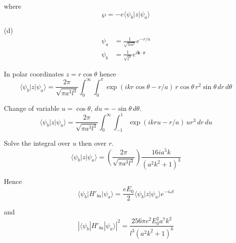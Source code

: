 where
\begin{equation*}
\wp=-e\langle\psi_b|z|\psi_a\rangle
\end{equation*}

(d)
\begin{align*}
\psi_a&=\frac{1}{\sqrt{\pi a^3}}e^{-r/a}
\\
\psi_b&=\frac{1}{\sqrt{l^3}}e^{i\mathbf k\cdot\mathbf r}
\end{align*}

In polar coordinates $z=r\cos\theta$ hence
\begin{equation*}
\langle\psi_b|z|\psi_a\rangle
=\frac{2\pi}{\sqrt{\pi a^3l^3}}
\int_0^\infty\int_0^\pi
\exp(ikr\cos\theta-r/a)\,r\cos\theta\,r^2\sin\theta\,dr\,d\theta
\end{equation*}

Change of variable $u=\cos\theta$, $du=-\sin\theta\,d\theta$.
\begin{equation*}
\langle\psi_b|z|\psi_a\rangle
=\frac{2\pi}{\sqrt{\pi a^3l^3}}
\int_0^\infty\int_{-1}^1
\exp(ikru-r/a)\,ur^3\,dr\,du
\end{equation*}

Solve the integral over $u$ then over $r$.
\begin{equation*}
\langle\psi_b|z|\psi_a\rangle
=\left(\frac{2\pi}{\sqrt{\pi a^3l^3}}\right)
\frac{16ia^5k}{(a^2k^2+1)^3}
\end{equation*}

Hence
\begin{equation*}
\langle\psi_b|H'_{ba}|\psi_a\rangle
=\frac{eE_0}{2}\langle\psi_b|z|\psi_a\rangle e^{-i\omega t}
\end{equation*}

and
\begin{equation*}
|\langle\psi_b|H'_{ba}|\psi_a\rangle|^2
=\frac{256\pi e^2E_0^2a^7k^2}{l^3(a^2k^2+1)^6}
\end{equation*}


